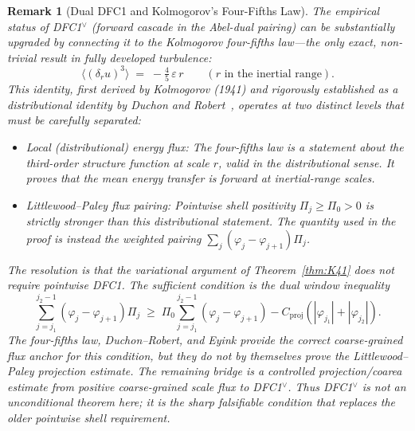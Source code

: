\documentclass[12pt,a4paper]{article}
\theoremstyle{breakdef}
\theoremstyle{breakplain}
\theoremstyle{breakdef}
\newtheorem{remark}[definition]{Remark}
\begin{document}
\begin{remark}[Dual DFC1 and Kolmogorov's Four-Fifths Law]
\label{rem:dfc1-four-fifths}
The empirical status of DFC1$^\vee$ (forward cascade in the Abel-dual
pairing) can be substantially upgraded by connecting it to the
Kolmogorov four-fifths law---the only exact, non-trivial result in fully
developed turbulence:
\[
\langle (\delta_r u)^3 \rangle \;=\; -\tfrac{4}{5}\,\varepsilon\, r \qquad (r \text{ in the inertial range}).
\]
This identity, first derived by Kolmogorov (1941) and rigorously
established as a distributional identity by Duchon and Robert~\cite{DR00},
operates at two distinct levels that must be carefully separated:
\begin{itemize}
\item \emph{Local (distributional) energy flux:} The four-fifths law is a
statement about the third-order structure function at scale $r$, valid in
the distributional sense. It proves that the \emph{mean} energy transfer
is forward at inertial-range scales.
\item \emph{Littlewood--Paley flux pairing:} Pointwise shell positivity
$\Pi_j \geq \Pi_0>0$ is strictly stronger than this distributional
statement. The quantity used in the proof is instead the weighted
pairing $\sum_j(\varphi_j-\varphi_{j+1})\Pi_j$.
\end{itemize}
The resolution is that the variational argument of Theorem~\ref{thm:K41}
does \emph{not} require pointwise DFC1. The sufficient condition is the
dual window inequality
\[
\sum_{j=j_1}^{j_2-1}(\varphi_j-\varphi_{j+1})\Pi_j
\;\ge\;
\Pi_0\sum_{j=j_1}^{j_2-1}(\varphi_j-\varphi_{j+1})
- C_{\mathrm{proj}}(|\varphi_{j_1}|+|\varphi_{j_2}|).
\]
The four-fifths law, Duchon--Robert, and Eyink provide the correct
coarse-grained flux anchor for this condition, but they do not by
themselves prove the Littlewood--Paley projection estimate. The remaining
bridge is a controlled projection/coarea estimate from positive
coarse-grained scale flux to DFC1$^\vee$. Thus DFC1$^\vee$ is not an
unconditional theorem here; it is the sharp falsifiable condition that
replaces the older pointwise shell requirement.
\end{remark}
\end{document}
